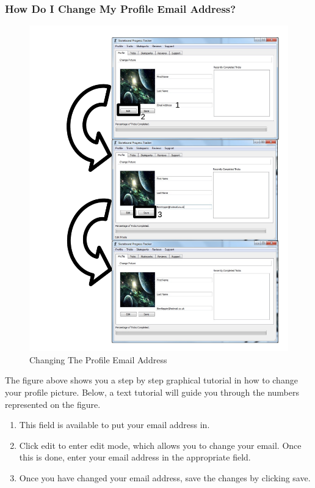 \subsubsection{How Do I Change My Profile Email Address?} \label{ChangeEmail}

\begin{figure}[H]
    \includegraphics[width=\textwidth]{./Manual/Images/ChangeEmail.pdf}
    \caption{Changing The Profile Email Address} \label{fig:Change Email}
\end{figure}

The figure above shows you a step by step graphical tutorial in how to change your profile picture. Below, a text tutorial will guide you through the numbers represented on the figure.

\begin{enumerate}
\item This field is available to put your email address in.
\item Click edit to enter edit mode, which allows you to change your email. Once this is done, enter your email address in the appropriate field.
\item Once you have changed your email address, save the changes by clicking save.
\end{enumerate}

